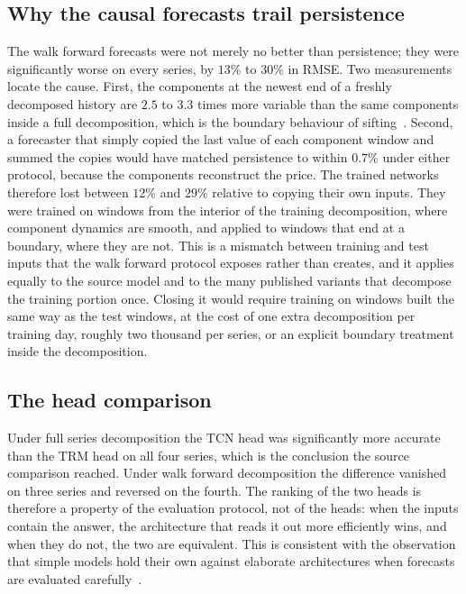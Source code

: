 \documentclass[pdflatex,sn-mathphys-num]{sn-jnl}%
\theoremstyle{thmstyleone}%
\theoremstyle{thmstyletwo}%
\theoremstyle{thmstylethree}%
\begin{document}
\subsection{Why the causal forecasts trail persistence}
The walk forward forecasts were not merely no better than persistence; they
were significantly worse on every series, by $13\%$ to $30\%$ in RMSE. Two
measurements locate the cause. First, the components at the newest end of a
freshly decomposed history are $2.5$ to $3.3$ times more variable than the same
components inside a full decomposition, which is the boundary behaviour of
sifting~\cite{emdtutorial2023}. Second, a forecaster that simply copied the
last value of each component window and summed the copies would have matched
persistence to within $0.7\%$ under either protocol, because the components
reconstruct the price. The trained networks therefore lost between $12\%$ and
$29\%$ relative to copying their own inputs. They were trained on windows from
the interior of the training decomposition, where component dynamics are
smooth, and applied to windows that end at a boundary, where they are not. This
is a mismatch between training and test inputs that the walk forward protocol
exposes rather than creates, and it applies equally to the source model and to
the many published variants that decompose the training portion once. Closing
it would require training on windows built the same way as the test windows,
at the cost of one extra decomposition per training day, roughly two thousand
per series, or an explicit boundary treatment inside the decomposition.

\subsection{The head comparison}
Under full series decomposition the TCN head was significantly more accurate
than the TRM head on all four series, which is the conclusion the source
comparison reached. Under walk forward decomposition the difference vanished
on three series and reversed on the fourth. The ranking of the two heads is
therefore a property of the evaluation protocol, not of the heads: when the
inputs contain the answer, the architecture that reads it out more efficiently
wins, and when they do not, the two are equivalent. This is consistent with the
observation that simple models hold their own against elaborate architectures
when forecasts are evaluated carefully~\cite{zeng2023,hewamalage2022}.
\end{document}
